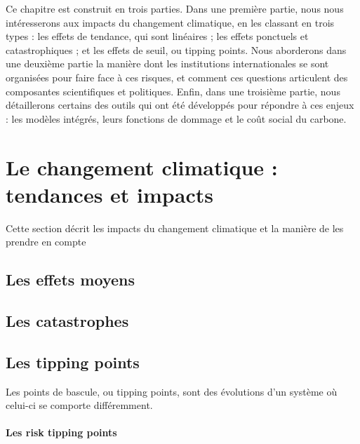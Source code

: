 Ce chapitre est construit en trois parties. Dans une première partie, nous nous intéresserons aux impacts du changement climatique, en les classant en trois types : les effets de tendance, qui sont linéaires ; les effets ponctuels et catastrophiques ; et les effets de seuil, ou tipping points. Nous aborderons dans une deuxième partie la manière dont les institutions internationales se sont organisées pour faire face à ces risques, et comment ces questions articulent des composantes scientifiques et politiques. Enfin, dans une troisième partie, nous détaillerons certains des outils qui ont été développés pour répondre à ces enjeux : les modèles intégrés, leurs fonctions de dommage et le coût social du carbone. 




    \section{Le changement climatique : tendances et impacts}

Cette section décrit les impacts du changement climatique et la manière de les prendre en compte

\subsection{Les effets moyens}


\subsection{Les catastrophes}

\subsection{Les tipping points}

Les points de bascule, ou tipping points, sont des évolutions d'un système où celui-ci se comporte différemment. 

\paragraph{Les risk tipping points}

